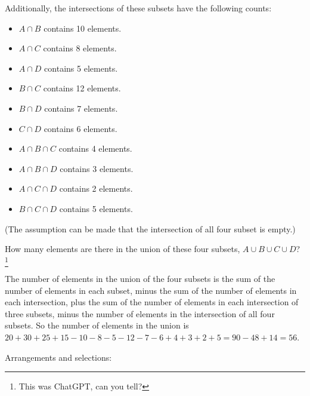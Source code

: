 \documentclass[a4paper,10pt]{exam}
\begin{document}
\begin{questions}
\begin{parts}
        Additionally, the intersections of these subsets have the following counts:
        \begin{itemize}
            \item  \( A \cap B \) contains 10 elements.
            \item  \( A \cap C \) contains 8 elements.
            \item  \( A \cap D \) contains 5 elements.
            \item  \( B \cap C \) contains 12 elements.
            \item  \( B \cap D \) contains 7 elements.
            \item  \( C \cap D \) contains 6 elements.
            \item  \( A \cap B \cap C \) contains 4 elements.
            \item  \( A \cap B \cap D \) contains 3 elements.
            \item  \( A \cap C \cap D \) contains 2 elements.
            \item  \( B \cap C \cap D \) contains 5 elements.
        \end{itemize}

        (The assumption can be made that the intersection of all four subset is empty.)
        
        How many elements are there in the union of these four subsets, \( A \cup B \cup C \cup D \)? \footnote{This was ChatGPT, can you tell?}
        \begin{solution}
            The number of elements in the union of the four subsets is the sum of the number of elements in each subset, minus the sum of the number of elements in each intersection, plus the sum of the number of elements in each intersection of three subsets, minus the number of elements in the intersection of all four subsets. 
            So the number of elements in the union is \(20 + 30 + 25 + 15 - 10 - 8 - 5 - 12 - 7 - 6 + 4 + 3 + 2 + 5 = 90 - 48 + 14 = 56\).
        \end{solution}
    \end{parts}
    \question Arrangements and selections:
\end{questions}
\end{document}
